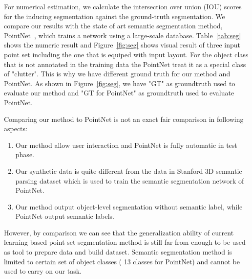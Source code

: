 %
For numerical estimation, we calculate the intersection over union (IOU) scores for the inducing segmentation against the ground-truth segmentation.
% 
We compare our results with the state of art semantic segmentation method, PointNet~\cite{qi2016pointnet}, which trains a network using a large-scale database. 
%
Table~\ref{tab:seg} shows the numeric result and Figure~\ref{fig:seg} shows visual result of three input point set including the one that is equiped with input layout.
For the object class that is not annotated in the training data the PointNet treat it as a special class of "clutter". This is why we have different ground truth for our method and PointNet. As shown in Figure~\ref{fig:seg}, we have "GT" as groundtruth used to evaluate our method and "GT for PointNet" as groundtruth used to evaluate PointNet. 
%

Comparing our method to PointNet is not an exact fair comparison in following aspects:
\begin{enumerate}
\item Our method allow user interaction and PointNet is fully automatic in test phase.
\item Our synthetic data is quite different from the data in Stanford 3D semantic parsing dataset\cite{semsegdataset} which is used to train the semantic segmentation network of PointNet.
\item Our method output object-level segmentation without semantic label, while PointNet output semantic labels.  
\end{enumerate}
However, by comparison we can see that the generalization ability of current learning based point set segmentation method is still far from enough to be used as tool to prepare data and build dataset. Semantic segmentation method is limited to certain set of object classes ( 13 classes for PointNet) and cannot be used to carry on our task. 
